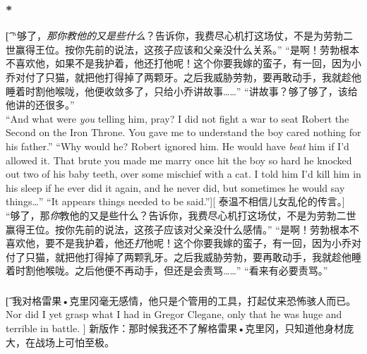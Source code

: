\documentclass[12pt,a4paper]{article}
\begin{document}
  
\subsubsection{\color{red}*}\t[	
	“够了，\emph{那你教他的又是些什么}？告诉你，我费尽心机打这场仗，不是为劳勃二世赢得王位。按你先前的说法，这孩子应该和父亲没什么关系。”
	“是啊！劳勃根本不喜欢他，如果不是我护着，他还打他呢！这个你要我嫁的蛮子，有一回，因为小乔对付了只猫，就把他打得掉了两颗牙。之后我威胁劳勃，要再敢动手，我就趁他睡着时割他喉咙，他便收敛多了，只给小乔讲故事……”
	“讲故事？够了够了，该给他讲的还很多。”\\
	“And what were \emph{you} telling him, pray? I did not fight a war to seat Robert the Second on the Iron Throne. You gave me to understand the boy cared nothing for his father.”
	“Why would he? Robert ignored him. He would have \emph{beat} him if I'd allowed it. That brute you made me marry once hit the boy so hard he knocked out two of his baby teeth, over some mischief with a cat. I told him I'd kill him in his sleep if he ever did it again, and he never did, but sometimes he would say things\ldots”
	“It appears things needed to be said.”][
	泰温不相信儿女乱伦的传言。]
	“够了，那\emph{你}教他的又是些什么？告诉你，我费尽心机打这场仗，不是为劳勃二世赢得王位。按你先前的说法，这孩子应该对父亲没什么感情。”
	“是啊！劳勃根本不喜欢他，要不是我护着，他还\emph{打}他呢！这个你要我嫁的蛮子，有一回，因为小乔对付了只猫，就把他打得掉了两颗乳牙。之后我威胁劳勃，要再敢动手，我就趁他睡着时割他喉咙。之后他便不再动手，但还是会责骂……”
	“看来有必要责骂。”
	 
\subsubsection{}\t[
	我对格雷果•克里冈毫无感情，他只是个管用的工具，打起仗来恐怖骇人而已。\\
	Nor did I yet grasp what I had in Gregor Clegane, only that he was huge and terrible in battle. ]
	新版作：那时候我还不了解格雷果•克里冈，只知道他身材庞大，在战场上可怕至极。
	
\end{document}
